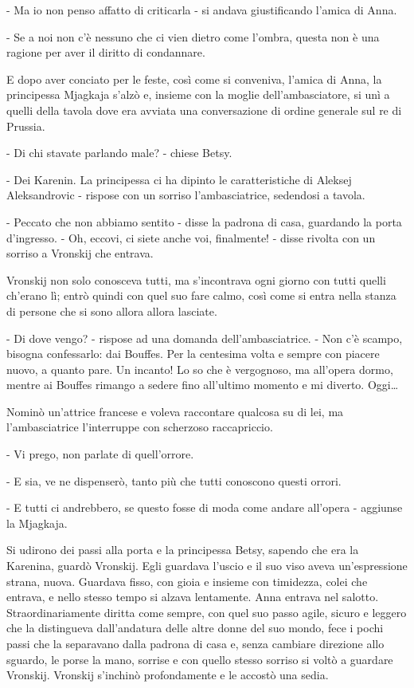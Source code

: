 - Ma io non penso affatto di criticarla - si andava giustificando l'amica di Anna. 

- Se a noi non c'è nessuno che ci vien dietro come l'ombra, questa non è una ragione per aver il diritto di condannare. 

E dopo aver conciato per le feste, così come si conveniva, l'amica di Anna, la principessa Mjagkaja s'alzò e, insieme con la moglie dell'ambasciatore, si unì a quelli della tavola dove era avviata una conversazione di ordine generale sul re di Prussia. 

- Di chi stavate parlando male? - chiese Betsy. 

- Dei Karenin. La principessa ci ha dipinto le caratteristiche di Aleksej Aleksandrovic - rispose con un sorriso l'ambasciatrice, sedendosi a tavola. 

- Peccato che non abbiamo sentito - disse la padrona di casa, guardando la porta d'ingresso. - Oh, eccovi, ci siete anche voi, finalmente! - disse rivolta con un sorriso a Vronskij che entrava. 

Vronskij non solo conosceva tutti, ma s'incontrava ogni giorno con tutti quelli ch'erano lì; entrò quindi con quel suo fare calmo, così come si entra nella stanza di persone che si sono allora allora lasciate. 

- Di dove vengo? - rispose ad una domanda dell'ambasciatrice. - Non c'è scampo, bisogna confessarlo: dai Bouffes. Per la centesima volta e sempre con piacere nuovo, a quanto pare. Un incanto! Lo so che è vergognoso, ma all'opera dormo, mentre ai Bouffes rimango a sedere fino all'ultimo momento e mi diverto. Oggi\ldots{} 

Nominò un'attrice francese e voleva raccontare qualcosa su di lei, ma l'ambasciatrice l'interruppe con scherzoso raccapriccio. 

- Vi prego, non parlate di quell'orrore. 

- E sia, ve ne dispenserò, tanto più che tutti conoscono questi orrori. 

- E tutti ci andrebbero, se questo fosse di moda come andare all'opera - aggiunse la Mjagkaja. 

Si udirono dei passi alla porta e la principessa Betsy, sapendo che era la Karenina, guardò Vronskij. Egli guardava l'uscio e il suo viso aveva un'espressione strana, nuova. Guardava fisso, con gioia e insieme con timidezza, colei che entrava, e nello stesso tempo si alzava lentamente. Anna entrava nel salotto. Straordinariamente diritta come sempre, con quel suo passo agile, sicuro e leggero che la distingueva dall'andatura delle altre donne del suo mondo, fece i pochi passi che la separavano dalla padrona di casa e, senza cambiare direzione allo sguardo, le porse la mano, sorrise e con quello stesso sorriso si voltò a guardare Vronskij. Vronskij s'inchinò profondamente e le accostò una sedia. 

